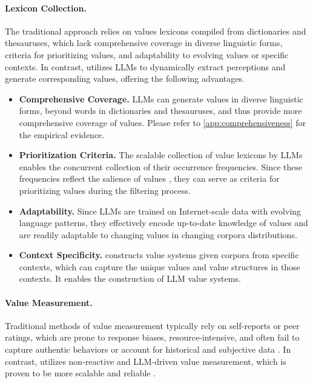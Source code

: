 \paragraph{Lexicon Collection.} The traditional approach relies on values lexicons compiled from dictionaries and thesauruses, which lack comprehensive coverage in diverse linguistic forms, criteria for prioritizing values, and adaptability to evolving values or specific contexts. In contrast, \our{} utilizes LLMs to dynamically extract perceptions and generate corresponding values, offering the following advantages.
\begin{itemize}
  \item \textbf{Comprehensive Coverage.} LLMs can generate values in diverse linguistic forms, beyond words in dictionaries and thesauruses, and thus provide more comprehensive coverage of values. Please refer to \cref{app:comprehensiveness} for the empirical evidence.

  \item \textbf{Prioritization Criteria.} The scalable collection of value lexicons by LLMs enables the concurrent collection of their occurrence frequencies. Since these frequencies reflect the salience of values \cite{ponizovskiy2020development}, they can serve as criteria for prioritizing values during the filtering process.

  \item \textbf{Adaptability.} Since LLMs are trained on Internet-scale data with evolving language patterns, they effectively encode up-to-date knowledge of values and are readily adaptable to changing values in changing corpora distributions.

  \item \textbf{Context Specificity.} \our{} constructs value systems given corpora from specific contexts, which can capture the unique values and value structures in those contexts. It enables the construction of LLM value systems.
\end{itemize}

\paragraph{Value Measurement.} Traditional methods of value measurement typically rely on self-reports or peer ratings, which are prone to response biases, resource-intensive, and often fail to capture authentic behaviors or account for historical and subjective data \cite{ponizovskiy2020development}. In contrast, \our{} utilizes non-reactive and LLM-driven value measurement, which is proven to be more scalable and reliable \cite{ye2025gpv}.


